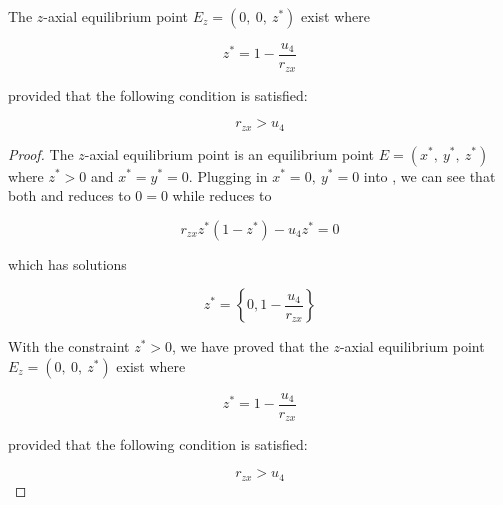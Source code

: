 \begin{theorem}\label{thm:eq-axial-z-exist}
    The $z$-axial equilibrium point $E_z=\left(0,\ 0,\ z^*\right)$ exist where
    
    \begin{equation*}
        z^* = 1-\frac{u_4}{r_{zx}}
    \end{equation*}

    provided that the following condition is satisfied:
    
    \begin{equation*}
        r_{zx} > u_4
    \end{equation*}
\end{theorem}
\begin{proof}
    The $z$-axial equilibrium point is an equilibrium point $E=\left(x^*,\ y^*,\ z^*\right)$ where $z^*>0$ and $x^*=y^*=0$. Plugging in $x^*=0,\ y^*=0$ into , we can see that both  and  reduces to $0=0$ while  reduces to

    \begin{equation*}
        r_{zx}z^*\left(1-z^*\right)-u_4z^*=0
    \end{equation*}

    which has solutions
    
    \begin{equation*}
        z^*=\left\{0,1-\frac{u_4}{r_{zx}}\right\}
    \end{equation*}
    
    With the constraint $z^*>0$, we have proved that the $z$-axial equilibrium point $E_z=\left(0,\ 0,\ z^*\right)$ exist where
    
    \begin{equation*}
        z^* = 1-\frac{u_4}{r_{zx}}
    \end{equation*}

    provided that the following condition is satisfied:
    
    \begin{equation*}
        r_{zx} > u_4
    \end{equation*}
\end{proof}

